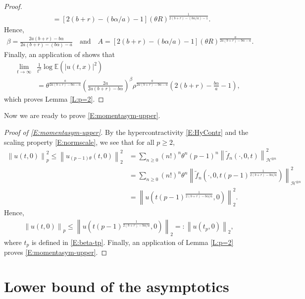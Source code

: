 \documentclass[a4paper,11pt]{article}
\numberwithin{equation}{section}
\numberwithin{equation}{section}
\theoremstyle{plain}
\theoremstyle{definition}
\newcommand{\Norm}[1]{\left\|  #1   \right\|}
\begin{document}
\begin{proof}
\begin{align*}
    & = [2(b+r) - (b\alpha/a) -1](\theta R)^{\frac{1}{2(b+r)-(b\alpha/a)-1}}.
  \end{align*}
  Hence,
  \begin{align*}
    \beta = \frac{2a(b+r)-b\alpha}{2a(b+r)-(b\alpha)-a} \quad \text{and} \quad
      A   = [2(b+r) - (b\alpha/a) -1](\theta R)^{\frac{a}{2a(b+r)-b\alpha-a}}.
  \end{align*}
  Finally, an application of \cite[Lemma A.2]{BCC21} shows that
  \begin{align*}
    \lim_{t\to \infty}
    & \frac{1}{t^\beta} \log \mathbb{E}(|u(t,x)|^2) \\
    & = \theta^{\frac{a}{2a(b+r)-b\alpha-a}}\left( \frac{2a}{2a(b+r)- b\alpha} \right)^\beta \rho^{\frac{a}{2a(b+r)-b\alpha-a}}\left(2(b+r)-\frac{b\alpha}{a}-1\right),
  \end{align*}
  which proves Lemma \ref{L:p=2}.
\end{proof}

Now we are ready to prove \eqref{E:momentasym-upper}.

\begin{proof}[Proof of \eqref{E:momentasym-upper}]
  By the hypercontractivity \eqref{E:HyContr} and the scaling property \eqref{E:normscale}, we see
  that for all $p \ge 2$,
  \begin{align*}
    \Norm{u(t,0)}_p^2  \le
    \Norm{u_{(p-1)\theta}(t,0)}_2^2
    & = \sum_{n \ge 0}(n!)^n\theta^n(p-1)^n \Norm{\widetilde{f}_n(\cdot,0,t)}_{\mathcal{H}^{\otimes n}}^2                                       \\
    & = \sum_{n \ge 0}(n!)^n\theta^n \Norm{\widetilde{f}_n\left(\cdot,0,t(p-1)^{\frac{1}{2(b+r)-b\alpha/a}}\right)}_{\mathcal{H}^{\otimes n}}^2 \\
    & = \Norm{u\left(t(p-1)^{\frac{1}{2(b+r)-b\alpha/a}}, 0\right)}_2^2.
  \end{align*}
  Hence,
  \begin{align} \label{E:pMom2}
    \Norm{u(t,0)}_p \le \Norm{u\left(t(p-1)^{\frac{1}{2(b+r)-b\alpha/a}}, 0\right)}_2 =: \Norm{u(t_p,0)}_2,
  \end{align}
  where $t_p$ is defined in \eqref{E:beta-tp}. Finally, an application of Lemma \ref{L:p=2} proves
  \eqref{E:momentasym-upper}.
\end{proof}

\section{Lower bound of the asymptotics} \label{S:lowerbd}
\end{document}

